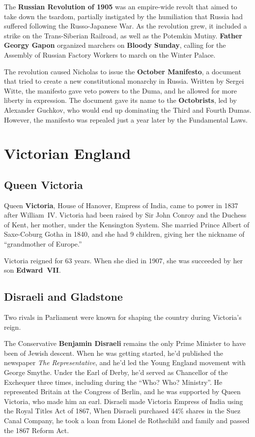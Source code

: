 The \textbf{Russian Revolution of 1905} was an empire-wide revolt that aimed to take down the tsardom,
partially instigated by the humiliation that Russia had suffered following the Russo-Japanese War.
As the revolution grew, it included a strike on the Trans-Siberian Railroad,
as well as the Potemkin Mutiny.
\textbf{Father Georgy Gapon} organized marchers on \textbf{Bloody Sunday},
calling for the Assembly of Russian Factory Workers to march on the Winter Palace.

The revolution caused Nicholas to issue the \textbf{October Manifesto},
a document that tried to create a new constitutional monarchy in Russia.
Written by Sergei Witte, the manifesto gave veto powers to the Duma, and he allowed for more liberty in expression.
The document gave its name to the \textbf{Octobrists}, led by Alexander Guchkov,
who would end up dominating the Third and Fourth Dumas.
However, the manifesto was repealed just a year later by the Fundamental Laws.

\section{Victorian England}

\subsection*{Queen Victoria}

Queen \textbf{Victoria}, House of Hanover, Empress of India, came to power in 1837 after William~IV\@.
Victoria had been raised by Sir John Conroy and the Duchess of Kent, her mother, under the Kensington System.
She married Prince Albert of Saxe-Coburg Gotha in 1840, and she had 9 children,
giving her the nickname of ``grandmother of Europe.''

Victoria reigned for 63 years.
When she died in 1907, she was succeeded by her son \textbf{Edward~VII}.

\subsection*{Disraeli and Gladstone}

Two rivals in Parliament were known for shaping the country during Victoria's reign.

The Conservative \textbf{Benjamin Disraeli} remains the only Prime Minister to have been of Jewish descent.
When he was getting started, he'd published the newspaper \textit{The Representative},
and he'd led the Young England movement with George Smythe.
Under the Earl of Derby, he'd served as Chancellor of the Exchequer three times,
including during the ``Who? Who? Ministry''.
He represented Britain at the Congress of Berlin, and he was supported by Queen Victoria, who made him an earl.
Disraeli made Victoria Empress of India using the Royal Titles Act of 1867,
When Disraeli purchased 44\% shares in the Suez Canal Company,
he took a loan from Lionel de Rothschild and family and passed the 1867 Reform Act.

